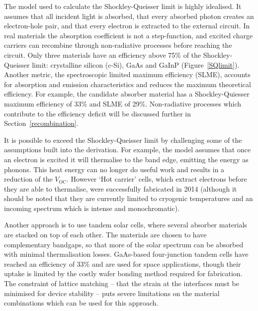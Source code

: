 The model used to calculate the Shockley-Queisser limit is highly idealised. It assumes that all incident light is absorbed, that every absorbed photon creates an electron-hole pair, and that every electron is extracted to the external circuit. In real materials the absorption coefficient is not a step-function, and excited charge carriers can recombine through non-radiative processes before reaching the circuit. Only three materials have an efficiency above 75\% of the Shockley-Queisser limit: crystalline silicon (c-Si), GaAs and GaInP (Figure\ \ref{SQlimit}). Another metric, the spectroscopic limited maximum efficiency (SLME), accounts for absorption and emission characteristics and reduces the maximum theoretical efficiency.\autocite{Yu2012} For example, the candidate absorber material  has a Shockley-Quiesser maximum efficiency of 33\% and SLME of 29\%.\autocite{Bercx2016} Non-radiative processes which contribute to the efficiency deficit will be discussed further in Section\ \ref{recombination}.


It is possible to exceed the Shockley-Queisser limit by challenging some of the assumptions built into the derivation. For example, the model assumes that once an electron is excited it will thermalise to the band edge, emitting the energy as phonons. This heat energy can no longer do useful work and results in a reduction of the $V_{\text{OC}}$. However `Hot carrier' cells, which extract electrons before they are able to thermalise, were successfully fabricated in 2014 (although it should be noted that they are currently limited to cryogenic temperatures and an incoming spectrum which is intense and monochromatic).\autocite{Hirst2014} 

Another approach is to use tandem solar cells, where several absorber materials are stacked on top of each other. The materials are chosen to have complementary bandgaps, so that more of the solar spectrum can be absorbed with minimal thermalisation losses. GaAs-based four-junction tandem cells have reached an efficiency of 33\% and are used for space applications, though their uptake is limited by the costly wafer bonding method required for fabrication. The constraint of lattice matching -- that the strain at the interfaces must be minimised for device stability -- puts severe limitations on the material combinations which can be used for this approach. 

